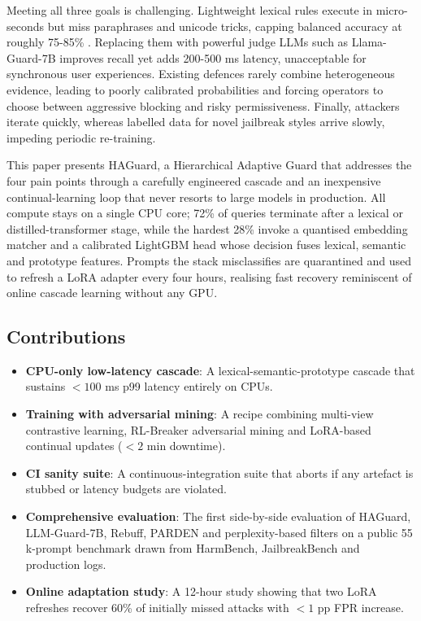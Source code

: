 \documentclass{article}
\begin{document}
Meeting all three goals is challenging. Lightweight lexical rules execute in micro-seconds but miss paraphrases and unicode tricks, capping balanced accuracy at roughly 75-85\% \cite{alon-2023-detecting}. Replacing them with powerful judge LLMs such as Llama-Guard-7B improves recall yet adds 200-500 ms latency, unacceptable for synchronous user experiences. Existing defences rarely combine heterogeneous evidence, leading to poorly calibrated probabilities and forcing operators to choose between aggressive blocking and risky permissiveness. Finally, attackers iterate quickly, whereas labelled data for novel jailbreak styles arrive slowly, impeding periodic re-training.

This paper presents HAGuard, a Hierarchical Adaptive Guard that addresses the four pain points through a carefully engineered cascade and an inexpensive continual-learning loop that never resorts to large models in production. All compute stays on a single CPU core; 72\% of queries terminate after a lexical or distilled-transformer stage, while the hardest 28\% invoke a quantised embedding matcher and a calibrated LightGBM head whose decision fuses lexical, semantic and prototype features. Prompts the stack misclassifies are quarantined and used to refresh a LoRA adapter every four hours, realising fast recovery reminiscent of online cascade learning \cite{nie-2024-online} without any GPU.

\subsection{Contributions}
\begin{itemize}
  \item \textbf{CPU-only low-latency cascade}: A lexical-semantic-prototype cascade that sustains $< 100$ ms p99 latency entirely on CPUs.
  \item \textbf{Training with adversarial mining}: A recipe combining multi-view contrastive learning, RL-Breaker adversarial mining \cite{chen-2024-when} and LoRA-based continual updates ($< 2$ min downtime).
  \item \textbf{CI sanity suite}: A continuous-integration suite that aborts if any artefact is stubbed or latency budgets are violated.
  \item \textbf{Comprehensive evaluation}: The first side-by-side evaluation of HAGuard, LLM-Guard-7B, Rebuff, PARDEN \cite{zhang-2024-parden} and perplexity-based filters on a public 55 k-prompt benchmark drawn from HarmBench, JailbreakBench and production logs.
  \item \textbf{Online adaptation study}: A 12-hour study showing that two LoRA refreshes recover 60\% of initially missed attacks with $< 1$ pp FPR increase.
\end{itemize}
\end{document}

